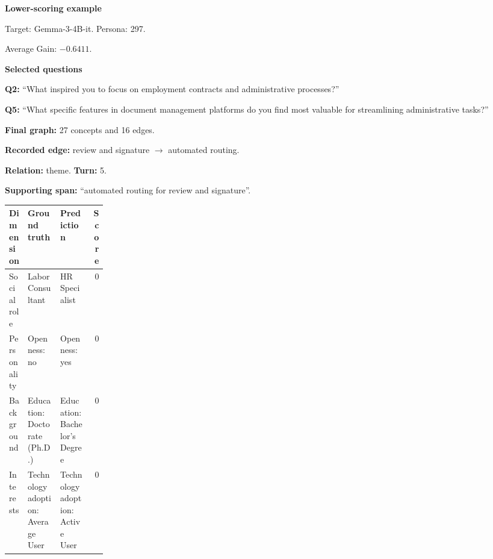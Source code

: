 \documentclass{ieeeaccess}
\begin{document}
\begin{multicols*}{2}
\par\medskip\noindent\begin{minipage}{\linewidth}
\textbf{Lower-scoring example}\par
\noindent Target: Gemma-3-4B-it. Persona: 297.\par
\noindent Average Gain: $-0.6411$.\par\smallskip
\noindent\textbf{Selected questions}\par
\noindent\textbf{Q2:} ``What inspired you to focus on employment contracts and administrative processes?''\par
\noindent\textbf{Q5:} ``What specific features in document management platforms do you find most valuable for streamlining administrative tasks?''\par\smallskip
\noindent\textbf{Final graph:} 27 concepts and 16 edges.\par
\noindent\textbf{Recorded edge:} review and signature $\rightarrow$ automated routing.\par
\noindent\textbf{Relation:} theme. \textbf{Turn:} 5.\par
\noindent\textbf{Supporting span:} ``automated routing for review and signature''.\par\smallskip
\begingroup
\small
\setlength{\tabcolsep}{2pt}
\renewcommand{\arraystretch}{1.12}
\noindent\begin{tabularx}{\linewidth}{@{}p{0.19\linewidth}>{\raggedright\arraybackslash}X>{\raggedright\arraybackslash}Xr@{}}
\toprule
Dimension & Ground truth & Prediction & Score \\
\midrule
Social role & Labor Consultant & HR Specialist & 0 \\
\addlinespace[2pt]
Personality & Openness: no & Openness: yes & 0 \\
\addlinespace[2pt]
Background & Education: Doctorate (Ph.D.) & Education: Bachelor's Degree & 0 \\
\addlinespace[2pt]
Interests & Technology adoption: Average User & Technology adoption: Active User & 0 \\
\bottomrule
\end{tabularx}\par
\endgroup
\end{minipage}\par\medskip

\smallskip


\end{multicols*}
\end{document}
